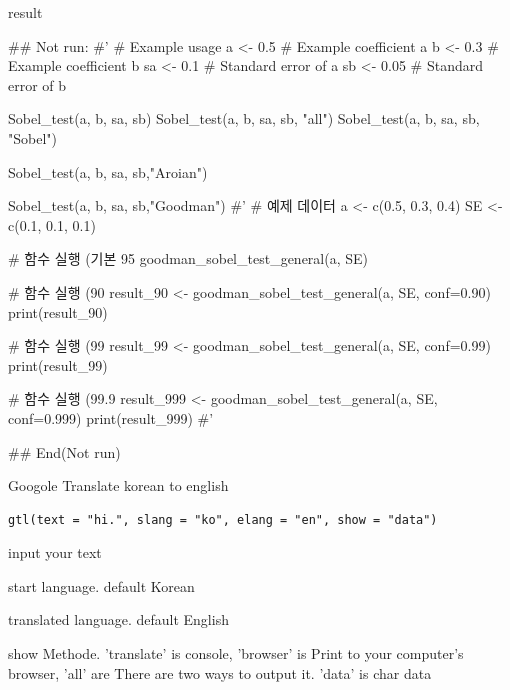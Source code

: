 \documentclass[a4paper]{book}
\begin{document}
%
\begin{Value}
result
\end{Value}
%
\begin{Examples}
\begin{ExampleCode}

## Not run: 
#'
# Example usage
a <- 0.5  # Example coefficient a
b <- 0.3  # Example coefficient b
sa <- 0.1 # Standard error of a
sb <- 0.05 # Standard error of b

Sobel_test(a, b, sa, sb)
Sobel_test(a, b, sa, sb, "all")
Sobel_test(a, b, sa, sb, "Sobel")

Sobel_test(a, b, sa, sb,"Aroian")

Sobel_test(a, b, sa, sb,"Goodman")
#'
# 예제 데이터
a <- c(0.5, 0.3, 0.4)
SE <- c(0.1, 0.1, 0.1)

# 함수 실행 (기본 95%
goodman_sobel_test_general(a, SE)

# 함수 실행 (90%
result_90 <- goodman_sobel_test_general(a, SE, conf=0.90)
print(result_90)

# 함수 실행 (99%
result_99 <- goodman_sobel_test_general(a, SE, conf=0.99)
print(result_99)

# 함수 실행 (99.9%
result_999 <- goodman_sobel_test_general(a, SE, conf=0.999)
print(result_999)
#'


## End(Not run)
\end{ExampleCode}
\end{Examples}
%
\begin{Description}
Googole Translate korean to english
\end{Description}
%
\begin{Usage}
\begin{verbatim}
gtl(text = "hi.", slang = "ko", elang = "en", show = "data")
\end{verbatim}
\end{Usage}
%
\begin{Arguments}
\begin{ldescription}
\item[\code{text}] input your text

\item[\code{slang}] start language. default Korean

\item[\code{elang}] translated language. default English

\item[\code{show}] show Methode. 'translate' is console, 'browser'  is Print to your computer's browser, 'all' are There are two ways to output it. 'data' is char data
\end{ldescription}
\end{Arguments}
\end{document}
